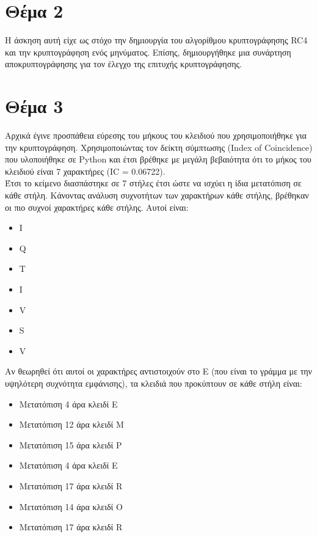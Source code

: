 \documentclass[a4paper, 11pt]{article}
\newcommand{\lt}{\latintext}
\begin{document}
\newpage


\section*{Θέμα 2}

Η άσκηση αυτή είχε ως στόχο την δημιουργία του αλγορίθμου κρυπτογράφησης {\lt RC4} και την κρυπτογράφηση ενός μηνύματος.
Επίσης, δημιουργήθηκε μια συνάρτηση αποκρυπτογράφησης για τον έλεγχο της επιτυχής κρυπτογράφησης.

\newpage


\section*{Θέμα 3}
Αρχικά έγινε προσπάθεια εύρεσης του μήκους του κλειδιού που χρησιμοποιήθηκε για την κρυπτογράφηση.
Χρησιμοποιώντας τον δείκτη σύμπτωσης ({\lt Index of Coincidence}) που υλοποιήθηκε σε {\lt Python} και έτσι βρέθηκε
με μεγάλη βεβαιότητα ότι το μήκος του κλειδιού είναι 7 χαρακτήρες ({\lt IC} = 0.06722).
\\
Έτσι το κείμενο διασπάστηκε σε 7 στήλες έτσι ώστε να ισχύει η ίδια μετατόπιση σε κάθε στήλη. Κάνοντας ανάλυση συχνοτήτων
των χαρακτήρων κάθε στήλης, βρέθηκαν οι πιο συχνοί χαρακτήρες κάθε στήλης. Αυτοί είναι:

{\lt
\begin{itemize}
	\item I
	\item Q
	\item T
	\item I
	\item V
	\item S
	\item V
\end{itemize}
}

Αν θεωρηθεί ότι αυτοί οι χαρακτήρες αντιστοιχούν στο {\lt E} (που είναι το γράμμα με την υψηλότερη συχνότητα εμφάνισης), τα
κλειδιά που προκύπτουν σε κάθε στήλη είναι:

\begin{itemize}
	\item Μετατόπιση 4 άρα κλειδί {\lt E}
	\item Μετατόπιση 12 άρα κλειδί {\lt M}
	\item Μετατόπιση 15 άρα κλειδί {\lt P}
	\item Μετατόπιση 4 άρα κλειδί {\lt E}
	\item Μετατόπιση 17 άρα κλειδί {\lt R}
	\item Μετατόπιση 14 άρα κλειδί {\lt O}
	\item Μετατόπιση 17 άρα κλειδί {\lt R}
\end{itemize}
\end{document}
